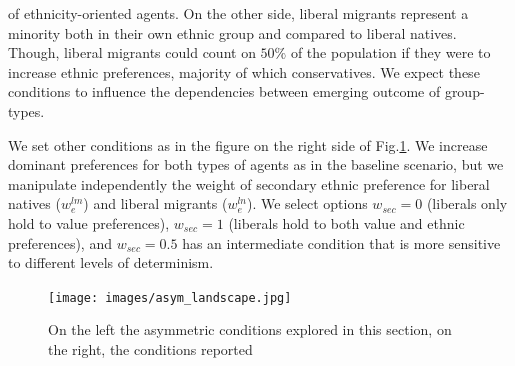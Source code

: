 \documentclass[
]{article}
\begin{document}
of ethnicity-oriented agents. On the other side, liberal migrants represent a minority both in their own ethnic group and compared to liberal natives. Though, liberal migrants could count on $50\%$ of the population if they were to increase ethnic preferences, majority of which conservatives. We expect these conditions to influence the dependencies between emerging outcome of group-types.

We set other conditions as in the figure on the right side of Fig.\ref{fig:asymlndscp}. We increase dominant preferences for both types of agents as in the baseline scenario, but we manipulate independently the weight of secondary ethnic preference for liberal natives ($w^{lm}_{e}$) and liberal migrants ($w^{ln}_{e}$). We select options $w_{sec} = 0$ (liberals only hold to value preferences), $w_{sec} = 1$ (liberals hold to both value and ethnic preferences), and $w_{sec} = 0.5$ has an intermediate condition that is more sensitive to different levels of determinism.




\begin{figure}[H]
    \centering
    \texttt{[image: images/asym\_landscape.jpg]}
    \caption{On the left the asymmetric conditions explored in this section, on the right, the conditions reported}
    \label{fig:asymlndscp}
\end{figure}
\end{document}
